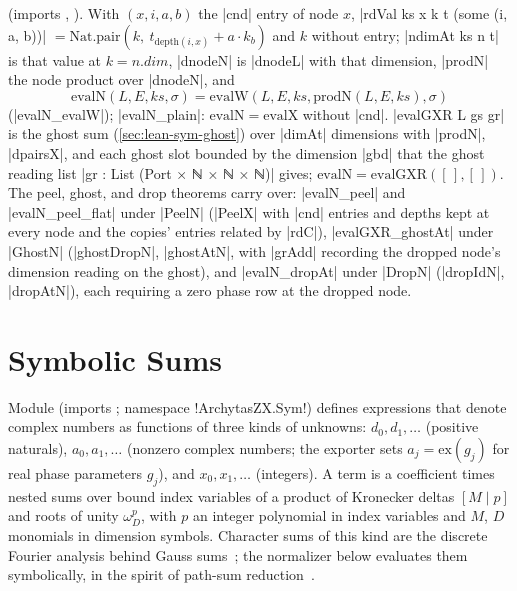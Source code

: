  (imports , ). With $(x,i,a,b)$ the \lean|cnd| entry of node $x$, \lean|rdVal ks x k t (some (i, a, b))| $=\mathrm{Nat.pair}(k,\ t_{\mathrm{depth}(i,x)}+a\cdot k_b)$ and $k$ without entry; \lean|ndimAt ks n t| is that value at $k=n.\mathit{dim}$, \lean|dnodeN| is \lean|dnodeL| with that dimension, \lean|prodN| the node product over \lean|dnodeN|, and
\[
\mathrm{evalN}(L,E,ks,\sigma)=\mathrm{evalW}(L,E,ks,\mathrm{prodN}(L,E,ks),\sigma)
\]
(\lean|evalN_evalW|); \lean|evalN_plain|: $\mathrm{evalN}=\mathrm{evalX}$ without \lean|cnd|.
\lean|evalGXR L gs gr| is the ghost sum (\cref{sec:lean-sym-ghost}) over \lean|dimAt| dimensions with \lean|prodN|, \lean|dpairsX|, and each ghost slot bounded by the dimension \lean|gbd| that the ghost reading list \lean|gr : List (Port × ℕ × ℕ × ℕ)| gives; $\mathrm{evalN}=\mathrm{evalGXR}([\,],[\,])$. The peel, ghost, and drop theorems carry over: \lean|evalN_peel| and \lean|evalN_peel_flat| under \lean|PeelN| (\lean|PeelX| with \lean|cnd| entries and depths kept at every node and the copies' entries related by \lean|rdC|), \lean|evalGXR_ghostAt| under \lean|GhostN| (\lean|ghostDropN|, \lean|ghostAtN|, with \lean|grAdd| recording the dropped node's dimension reading on the ghost), and \lean|evalN_dropAt| under \lean|DropN| (\lean|dropIdN|, \lean|dropAtN|), each requiring a zero phase row at the dropped node.

\section{Symbolic Sums}\label{sec:lean-sym-sym}

Module  (imports ; namespace \lean!ArchytasZX.Sym!) defines expressions that denote complex numbers as functions of three kinds of unknowns:  $d_0,d_1,\dots$ (positive naturals),  $a_0,a_1,\dots$ (nonzero complex numbers; the exporter sets $a_j=\mathrm{ex}(g_j)$ for real phase parameters $g_j$), and  $x_0,x_1,\dots$ (integers). A term is a coefficient times nested sums over bound index variables of a product of Kronecker deltas $[M\mid p]$ and roots of unity $\omega_D^{p}$, with $p$ an integer polynomial in index variables and $M$, $D$ monomials in dimension symbols. Character sums of this kind are the discrete Fourier analysis behind Gauss sums~\cite{berndt1998gauss}; the normalizer below evaluates them symbolically, in the spirit of path-sum reduction~\cite{amy2018pathsums}.

